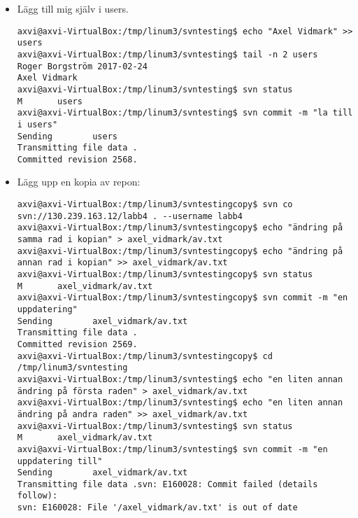 \documentclass[10pt, a4paper]{article}
\begin{document}
\begin{itemize}
\item Lägg till mig själv i users.
\begin{verbatim}
axvi@axvi-VirtualBox:/tmp/linum3/svntesting$ echo "Axel Vidmark" >> users 
axvi@axvi-VirtualBox:/tmp/linum3/svntesting$ tail -n 2 users 
Roger Borgström 2017-02-24
Axel Vidmark
axvi@axvi-VirtualBox:/tmp/linum3/svntesting$ svn status
M       users
axvi@axvi-VirtualBox:/tmp/linum3/svntesting$ svn commit -m "la till i users"
Sending        users
Transmitting file data .
Committed revision 2568.
\end{verbatim}

\item Lägg upp en kopia av repon:
\begin{verbatim}
axvi@axvi-VirtualBox:/tmp/linum3/svntestingcopy$ svn co svn://130.239.163.12/labb4 . --username labb4
axvi@axvi-VirtualBox:/tmp/linum3/svntestingcopy$ echo "ändring på samma rad i kopian" > axel_vidmark/av.txt
axvi@axvi-VirtualBox:/tmp/linum3/svntestingcopy$ echo "ändring på annan rad i kopian" >> axel_vidmark/av.txt
axvi@axvi-VirtualBox:/tmp/linum3/svntestingcopy$ svn status
M       axel_vidmark/av.txt
axvi@axvi-VirtualBox:/tmp/linum3/svntestingcopy$ svn commit -m "en uppdatering"
Sending        axel_vidmark/av.txt
Transmitting file data .
Committed revision 2569.
axvi@axvi-VirtualBox:/tmp/linum3/svntestingcopy$ cd /tmp/linum3/svntesting
axvi@axvi-VirtualBox:/tmp/linum3/svntesting$ echo "en liten annan ändring på första raden" > axel_vidmark/av.txt 
axvi@axvi-VirtualBox:/tmp/linum3/svntesting$ echo "en liten annan ändring på andra raden" >> axel_vidmark/av.txt 
axvi@axvi-VirtualBox:/tmp/linum3/svntesting$ svn status
M       axel_vidmark/av.txt
axvi@axvi-VirtualBox:/tmp/linum3/svntesting$ svn commit -m "en uppdatering till"
Sending        axel_vidmark/av.txt
Transmitting file data .svn: E160028: Commit failed (details follow):
svn: E160028: File '/axel_vidmark/av.txt' is out of date
\end{verbatim}


\end{itemize}
\end{document}
